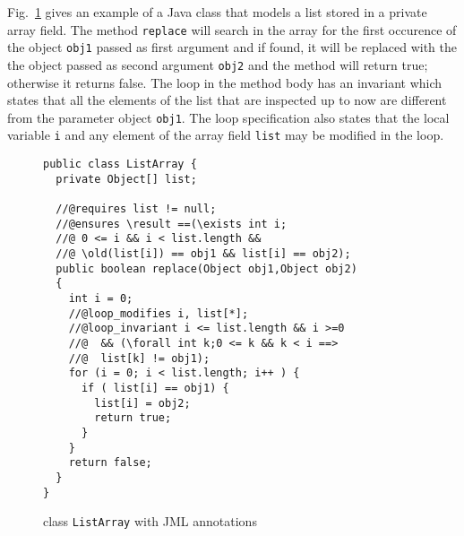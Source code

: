 Fig.~\ref{replaceSrc} gives an example of a Java class that models a list stored in a private array field. 
The method \texttt{replace} will search in the array for the first occurence of the object \texttt{obj1} passed as first argument and if found, it will be replaced with the 
the object passed as second argument \texttt{obj2} and the method will return true; otherwise it returns false. The loop in the method body has an invariant which states that all the elements of the list that are inspected up to now are different from the parameter object \texttt{obj1}. The loop specification also states
that the local variable \texttt{i} and any element of the array field \texttt{list} may be modified in the loop.
\begin{figure}[ht!]
\begin{verbatim}
public class ListArray {
  private Object[] list;

  //@requires list != null;
  //@ensures \result ==(\exists int i; 
  //@ 0 <= i && i < list.length && 
  //@ \old(list[i]) == obj1 && list[i] == obj2); 
  public boolean replace(Object obj1,Object obj2)
  {
    int i = 0;
    //@loop_modifies i, list[*];
    //@loop_invariant i <= list.length && i >=0 
    //@  && (\forall int k;0 <= k && k < i ==> 
    //@  list[k] != obj1); 
    for (i = 0; i < list.length; i++ ) {
      if ( list[i] == obj1) {
        list[i] = obj2;
        return true;	
      }
    }
    return false;
  }
}
\end{verbatim}
\caption{class \texttt{ListArray} with JML annotations} 
\label{replaceSrc}
\end{figure}


